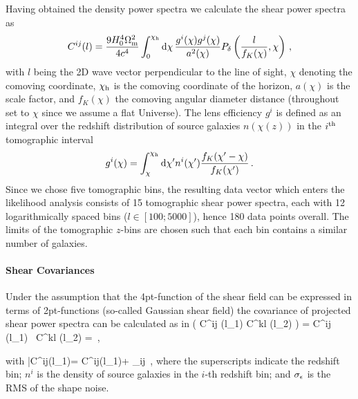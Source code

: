 Having obtained the density power spectra we calculate the shear power spectra as
\begin{equation}
\label{eq:pdeltatopkappa}
C ^{ij} (l) = \frac{9H_0^4 \om^2}{4c^4} \int_0^{\chi_\mr h}
\mr d \chi \, \frac{g^{i}(\chi) g^{j}(\chi)}{a^2(\chi)} \pd \left(\frac{l}{f_K(\chi)},\chi \right) \,,
\end{equation}
with $l$ being the 2D wave vector perpendicular to the line of sight, $\chi$ denoting the comoving coordinate, $\chi_\mathrm h$ is the comoving coordinate of the horizon, $a(\chi)$ is the scale factor, and $f_K(\chi)$ the comoving angular diameter distance (throughout set to $\chi$ since we assume a flat Universe). The lens efficiency $g^{i}$ is defined as an integral over the redshift distribution of source galaxies $n(\chi(z))$ in the $i^\mathrm{th}$ tomographic interval
\begin{equation}
\label{eq:redshift_distri}
g^{i}(\chi) = \int_\chi^{\chi_{\mr h}} \mr d \chi' n^{i} (\chi') \frac{f_K (\chi'-\chi)}{f_K (\chi')} \,.
\end{equation}
Since we chose five tomographic bins, the resulting data vector which enters the likelihood analysis consists of 15 tomographic shear power spectra, each with 12 logarithmically spaced bins ($l \in [100;5000]$), hence 180 data points overall. The limits of the tomographic $z$-bins are chosen such that each bin contains a similar number of galaxies.


\paragraph{Shear Covariances} Under the assumption that the 4pt-function of the shear field can be expressed in terms of 2pt-functions (so-called Gaussian shear field) the covariance of projected shear power spectra can be calculated as in \citep{huj04}
\be
\label{eq:covhujain}
 \left( C^{ij} (l_1) C^{kl} (l_2) \right) = \langle \Delta C^{ij} (l_1) \, \Delta C^{kl} (l_2) \rangle  =    \,,
\ee

with
\be
\label{details}
\bar C^{ij}(l_1)= C^{ij}(l_1)+ \delta_{ij}  \,,
\ee
where the superscripts indicate the redshift bin; $n^{i}$ is the density of source galaxies in the $i$-th redshift bin; and $\sigma_\epsilon$ is the RMS of the shape noise.

